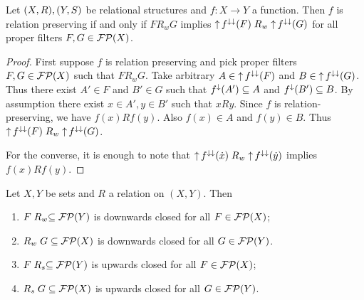 \begin{proposition} \label{relationPreservingfunctionToFilterInequality}
Let $\sSet{X, R},\sSet{Y, S}$ be relational structures and $f: X\to Y$ a function. Then $f$ is relation preserving \textup{if and only if} $F\mathrel{R_w}G$ implies $\operatorname{\uparrow} f^{\downarrow\downarrow}(F) \mathrel{R_w} \operatorname{\uparrow} f^{\downarrow\downarrow}(G)$ for all proper filters $F, G\in \operatorname{\mathcal{FP}}(X)$.
\end{proposition}
\begin{proof}
First suppose $f$ is relation preserving and pick proper filters $F,G\in \operatorname{\mathcal{FP}}(X)$ such that $F\mathrel{R_w}G$. Take arbitrary $A\in \operatorname{\uparrow} f^{\downarrow\downarrow}(F)$ and $B\in \operatorname{\uparrow} f^{\downarrow\downarrow}(G)$. Thus there exist $A'\in F$ and $B'\in G$ such that $f^{\downarrow}(A')\subseteq A$ and $f^{\downarrow}(B')\subseteq B$. 
By assumption there exist $x\in A', y\in B'$ such that $xRy$. Since $f$ is relation-preserving, we have $f(x)Rf(y)$. Also $f(x)\in A$ and $f(y)\in B$. Thus $\operatorname{\uparrow} f^{\downarrow\downarrow}(F) \mathrel{R_w} \operatorname{\uparrow} f^{\downarrow\downarrow}(G)$.

For the converse, it is enough to note that $\operatorname{\uparrow} f^{\downarrow\downarrow}(\dot{x}) \mathrel{R_w} \operatorname{\uparrow} f^{\downarrow\downarrow}(\dot{y})$ implies $f(x)Rf(y)$.
\end{proof}

\begin{proposition} \label{upDownClosureWeakStrongRelation}
Let $X,Y$ be sets and $R$ a relation on $(X,Y)$. Then
\begin{enumerate}
\item $F\mathrel{R_w} \subseteq \operatorname{\mathcal{FP}}(Y)$ is downwards closed for all $F\in\operatorname{\mathcal{FP}}(X)$;
\item $\mathrel{R_w}G  \subseteq \operatorname{\mathcal{FP}}(X)$ is downwards closed for all $G\in\operatorname{\mathcal{FP}}(Y)$.
\item $F\mathrel{R_s} \subseteq \operatorname{\mathcal{FP}}(Y)$ is upwards closed for all $F\in\operatorname{\mathcal{FP}}(X)$;
\item $\mathrel{R_s}G  \subseteq \operatorname{\mathcal{FP}}(X)$ is upwards closed for all $G\in\operatorname{\mathcal{FP}}(Y)$.
\end{enumerate}
\end{proposition}

